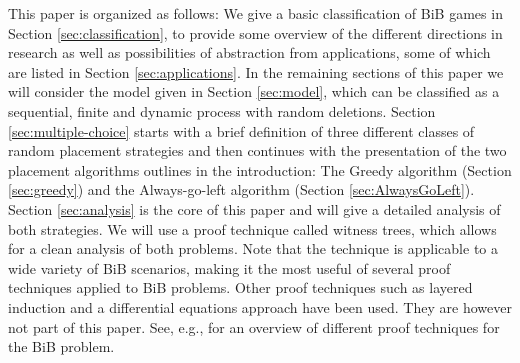 \documentclass[a4paper,12pt]{article}
\begin{document}
This paper is organized as follows: We give a basic classification of BiB games in Section \ref{sec:classification}, to provide some overview of the different directions in research as well as possibilities of abstraction from applications, some of which are listed in Section \ref{sec:applications}. In the remaining sections of this paper we will consider the model given in Section \ref{sec:model}, which can be classified as a sequential, finite and dynamic process with random deletions. Section \ref{sec:multiple-choice} starts with a brief definition of three different classes of random placement strategies and then continues with the presentation of the two placement algorithms outlines in the introduction: The  Greedy algorithm (Section \ref{sec:greedy}) and the Always-go-left algorithm (Section \ref{sec:AlwaysGoLeft}). Section \ref{sec:analysis} is the core of this paper and will give a detailed analysis of both strategies. We will use a proof technique called witness trees, which allows for a clean analysis of both problems. Note that the technique is applicable to a wide variety of BiB scenarios, making it the most useful of several proof techniques applied to BiB problems. Other proof techniques such as layered induction and a differential equations approach have been used. They are however not part of this paper. See, e.g., \cite{MRS01} for an overview of different proof techniques for the BiB problem.

\begin{comment}
In Section \ref{sec:strategies}, we will provide asymptotic bounds for the ad dative gap of this strategy, which we will then use to devise more complex strategies that significantly reduce these bounds. 
\end{comment}

\begin{comment}
These result may sometimes seem surprising, which is why we will denote a significant part of this article to demonstrate proofs in detail. This proof technique may be useful for devising asymptotic bounds for the additive gap of different BiB scenarios and strategies.
\end{comment}
\end{document}
